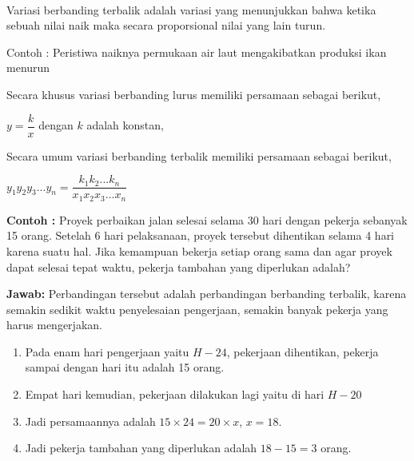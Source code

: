 \paragraph*{}
	Variasi berbanding terbalik adalah variasi yang menunjukkan bahwa ketika sebuah nilai naik maka secara proporsional nilai yang lain turun.
	\par
	Contoh : Peristiwa naiknya permukaan air laut mengakibatkan produksi ikan menurun
	\par
	Secara khusus variasi berbanding lurus memiliki persamaan sebagai berikut,
	\begin{center}
		$y=\dfrac{k}{x}$ dengan $k$ adalah konstan,
	\end{center}
	Secara umum variasi berbanding terbalik memiliki persamaan sebagai berikut, 
	\begin{center}
		$y_1y_2y_3...y_n=\dfrac{k_1k_2...k_n}{x_1x_2x_3...x_n}$
	\end{center}
	\textbf{Contoh :} Proyek perbaikan jalan selesai selama 30 hari dengan pekerja sebanyak 15 orang. Setelah 6 hari pelaksanaan, proyek tersebut dihentikan selama 4 hari karena suatu hal. Jika kemampuan bekerja setiap orang sama dan agar proyek dapat selesai tepat waktu, pekerja tambahan yang diperlukan adalah?
	
	\textbf{Jawab:} Perbandingan tersebut adalah perbandingan berbanding terbalik, karena semakin sedikit waktu penyelesaian pengerjaan, semakin banyak pekerja yang harus mengerjakan.
	\begin{enumerate}
		\item Pada enam hari pengerjaan yaitu  $H-24$, pekerjaan dihentikan, pekerja sampai dengan hari itu adalah 15 orang.
		\item Empat hari kemudian, pekerjaan dilakukan lagi yaitu di hari $H-20$
		\item Jadi persamaannya adalah $15\times 24=20\times x$, $x=18$.
		\item Jadi pekerja tambahan yang diperlukan adalah $18-15=3$ orang. 
	\end{enumerate}
	
	
		
	